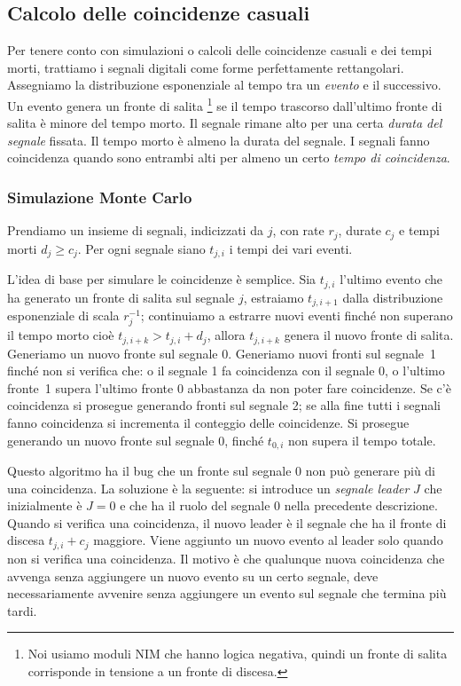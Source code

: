 \subsection{Calcolo delle coincidenze casuali}

Per tenere conto con simulazioni o calcoli delle coincidenze casuali e dei tempi morti,
trattiamo i segnali digitali come forme perfettamente rettangolari.
Assegniamo la distribuzione esponenziale al tempo tra un \emph{evento} e il successivo.
Un evento genera un fronte di salita%
\footnote{Noi usiamo moduli NIM che hanno logica negativa, quindi un fronte di salita corrisponde in tensione a un fronte di discesa.}
se il tempo trascorso dall'ultimo fronte di salita
è minore del tempo morto.
Il segnale rimane alto per una certa \emph{durata del segnale} fissata.
Il tempo morto è almeno la durata del segnale.
I segnali fanno coincidenza quando sono entrambi alti per almeno un certo \emph{tempo di coincidenza}.

\subsubsection{Simulazione Monte Carlo}

Prendiamo un insieme di segnali, indicizzati da $j$,
con rate $r_j$, durate $c_j$ e tempi morti $d_j \ge c_j$.
Per ogni segnale siano $t_{j,i}$ i tempi dei vari eventi.

L'idea di base per simulare le coincidenze è semplice.
Sia $t_{j,i}$ l'ultimo evento che ha generato un fronte di salita sul segnale $j$,
estraiamo $t_{j,i+1}$ dalla distribuzione esponenziale di scala $r_j^{-1}$;
continuiamo a estrarre nuovi eventi finché non superano il tempo morto cioè $t_{j,i+k}>t_{j,i} + d_j$,
allora $t_{j,i+k}$ genera il nuovo fronte di salita.
Generiamo un nuovo fronte sul segnale 0.
Generiamo nuovi fronti sul segnale~1 finché non si verifica che:
o il segnale 1 fa coincidenza con il segnale 0,
o l'ultimo fronte~1 supera l'ultimo fronte 0 abbastanza da non poter fare coincidenze.
Se c'è coincidenza si prosegue generando fronti sul segnale 2;
se alla fine tutti i segnali fanno coincidenza si incrementa il conteggio delle coincidenze.
Si prosegue generando un nuovo fronte sul segnale 0,
finché $t_{0,i}$ non supera il tempo totale.

Questo algoritmo ha il bug che un fronte sul segnale 0 non può generare più di una coincidenza.
La soluzione è la seguente:
si introduce un \emph{segnale leader} $J$ che inizialmente è $J=0$
e che ha il ruolo del segnale 0 nella precedente descrizione.
Quando si verifica una coincidenza,
il nuovo leader è il segnale che ha il fronte di discesa $t_{j,i}+c_j$ maggiore.
Viene aggiunto un nuovo evento al leader solo quando non si verifica una coincidenza.
Il motivo è che qualunque nuova coincidenza
che avvenga senza aggiungere un nuovo evento su un certo segnale,
deve necessariamente avvenire senza aggiungere un evento sul segnale che termina più tardi.

